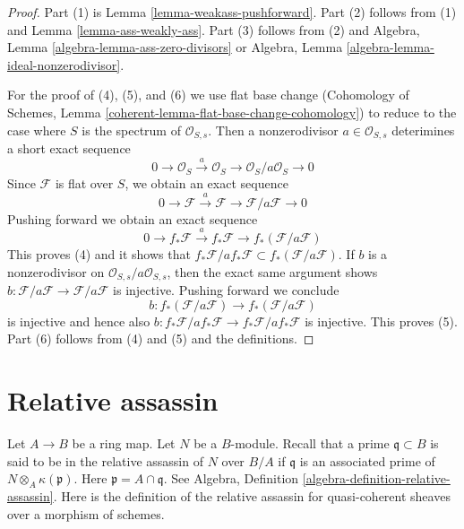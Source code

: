 \begin{proof}
Part (1) is Lemma \ref{lemma-weakass-pushforward}.
Part (2) follows from (1) and Lemma \ref{lemma-ass-weakly-ass}.
Part (3) follows from (2) and
Algebra, Lemma \ref{algebra-lemma-ass-zero-divisors} or
Algebra, Lemma \ref{algebra-lemma-ideal-nonzerodivisor}.

\medskip\noindent
For the proof of (4), (5), and (6) we use flat base change
(Cohomology of Schemes, Lemma
\ref{coherent-lemma-flat-base-change-cohomology})
to reduce to the case where $S$ is the spectrum of
$\mathcal{O}_{S, s}$.
Then a nonzerodivisor $a \in \mathcal{O}_{S, s}$
deterimines a short exact sequence
$$
0 \to \mathcal{O}_S \xrightarrow{a} \mathcal{O}_S \to
\mathcal{O}_S/a \mathcal{O}_S \to 0
$$
Since $\mathcal{F}$ is flat over $S$, we obtain an exact sequence
$$
0 \to \mathcal{F} \xrightarrow{a} \mathcal{F} \to
\mathcal{F}/a\mathcal{F} \to 0
$$
Pushing forward we obtain an exact sequence
$$
0 \to f_*\mathcal{F} \xrightarrow{a} f_*\mathcal{F} \to
f_*(\mathcal{F}/a\mathcal{F})
$$
This proves (4) and it shows that
$f_*\mathcal{F}/ af_*\mathcal{F} \subset f_*(\mathcal{F}/a\mathcal{F})$.
If $b$ is a nonzerodivisor on
$\mathcal{O}_{S, s}/a\mathcal{O}_{S, s}$, then the exact same argument shows
$b : \mathcal{F}/a\mathcal{F} \to \mathcal{F}/a\mathcal{F}$
is injective. Pushing forward we conclude
$$
b : f_*(\mathcal{F}/a\mathcal{F}) \to f_*(\mathcal{F}/a\mathcal{F})
$$
is injective and hence also
$b : f_*\mathcal{F}/ af_*\mathcal{F} \to f_*\mathcal{F}/ af_*\mathcal{F}$
is injective. This proves (5). Part (6) follows from
(4) and (5) and the definitions.
\end{proof}











\section{Relative assassin}
\label{section-relative-assassin}

\noindent
Let $A \to B$ be a ring map. Let $N$ be a $B$-module. Recall that
a prime $\mathfrak q \subset B$ is said to be in the relative assassin
of $N$ over $B/A$ if $\mathfrak q$ is an associated prime of
$N \otimes_A \kappa(\mathfrak p)$. Here $\mathfrak p = A \cap \mathfrak q$.
See Algebra, Definition \ref{algebra-definition-relative-assassin}.
Here is the definition of the relative assassin for quasi-coherent
sheaves over a morphism of schemes.

